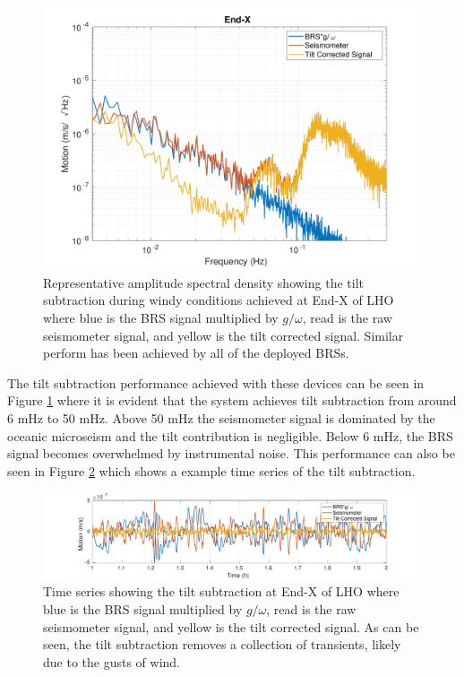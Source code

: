 \documentclass [12pt, proquest]{uwthesis}[2019]
\begin{document}
\begin{figure}%
\begin{center}
\includegraphics[width=\textwidth]{HSubtractionETMX.pdf}
\caption[Representative amplitude spectral density showing the tilt subtraction during windy conditions]{Representative amplitude spectral density showing the tilt subtraction during windy conditions achieved at End-X of LHO where blue is the BRS signal multiplied by $g/\omega$, read is the raw seismometer signal, and yellow is the tilt corrected signal. Similar perform has been achieved by all of the deployed BRSs.}
\label{sub}
\end{center}
\end{figure}

The tilt subtraction performance achieved with these devices can be seen in Figure \ref{sub} where it is evident that the system achieves tilt subtraction from around 6 mHz to 50 mHz. Above 50 mHz the seismometer signal is dominated by the oceanic microseism and the tilt contribution is negligible. Below 6 mHz, the BRS signal becomes overwhelmed by instrumental noise. This performance can also be seen in Figure \ref{subTime} which shows a example time series of the tilt subtraction. 

\begin{figure}%
\begin{center}
\includegraphics[width=\textwidth]{TiltCorrTime.pdf}
\caption[Time series showing tilt subtraction ]{Time series showing the tilt subtraction at End-X of LHO where blue is the BRS signal multiplied by $g/\omega$, read is the raw seismometer signal, and yellow is the tilt corrected signal. As can be seen, the tilt subtraction removes a collection of transients, likely due to the gusts of wind.}
\label{subTime}
\end{center}
\end{figure}
\end{document}
